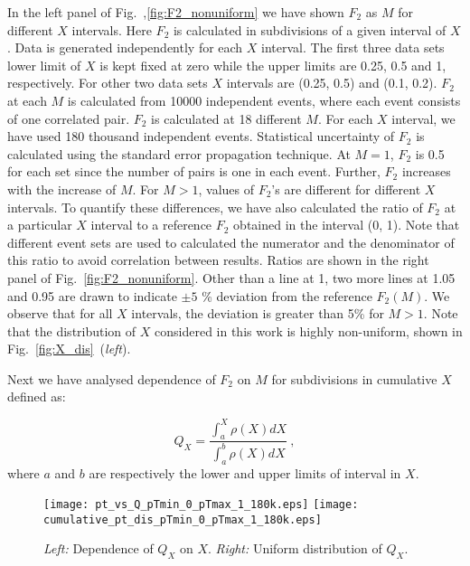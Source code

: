 \documentclass[floatfix,superscriptaddress,a4paper,
               nofootinbib,preprint]{revtex4}
\begin{document}
In the left panel of Fig.~,\ref{fig:F2_nonuniform} we have shown $F_2$ as $M$ for different $X$ intervals. Here $F_2$ is calculated in subdivisions of a given interval of $X$. Data is generated independently for each $X$ interval. The first three data sets lower limit of $X$ is kept fixed at zero while the upper limits are 0.25, 0.5 and 1, respectively. For other two data sets $X$ intervals are (0.25, 0.5) and (0.1, 0.2).
$F_2$ at each $M$ is calculated from 10000 independent events, where each event consists of one correlated pair. $F_2$ is calculated at 18 different $M$. For each $X$ interval, we have used 180 thousand independent events.
Statistical uncertainty  of $F_2$ is calculated using the standard error propagation technique. At $M =1$, $F_2$ is 0.5 for each set since the number of pairs is one in each event. Further, $F_2$ increases with the increase of $M$. For $M>1$, values of $F_2$'s are different for different $X$ intervals. 
To quantify these differences, we have also calculated the ratio of $F_2$ at a particular $X$ interval to a reference $F_2$ obtained in the interval (0, 1). Note that different event sets are used to calculated the numerator and the denominator of this ratio to avoid correlation between results.
Ratios are shown in the right panel of Fig.~\ref{fig:F2_nonuniform}. Other than a line at 1, two more lines at 1.05 and 0.95 are drawn to indicate $\pm 5$ \% deviation from the reference $F_2(M)$. We observe that for all $X$ intervals, the deviation is greater than 5\% for $M>1$. Note that the distribution of $X$ considered in this work is highly non-uniform, shown 
in Fig.~\ref{fig:X_dis}~(\textit{left}).

Next we have analysed dependence of $F_2$ on $M$ for subdivisions in cumulative $X$ \cite{Bialas:1990dk} defined as:

\begin{equation}\label{eq:Q_X}
 Q_X = \frac{\int_{a}^{X} \rho(X) dX}{\int_{a}^{b} \rho(X) dX}~,
\end{equation}
where $a$ and $b$ are respectively the lower and upper limits of interval in $X$.


\begin{figure}
\centering
 \begin{center}
\texttt{[image: pt\_vs\_Q\_pTmin\_0\_pTmax\_1\_180k.eps]}
\texttt{[image: cumulative\_pt\_dis\_pTmin\_0\_pTmax\_1\_180k.eps]}
\end{center}
\caption{\textit{Left:} Dependence of $Q_X$ on $X$. \textit{Right:} Uniform distribution of $Q_X$.}
\label{fig:QX_dis}
\end{figure}
\end{document}
